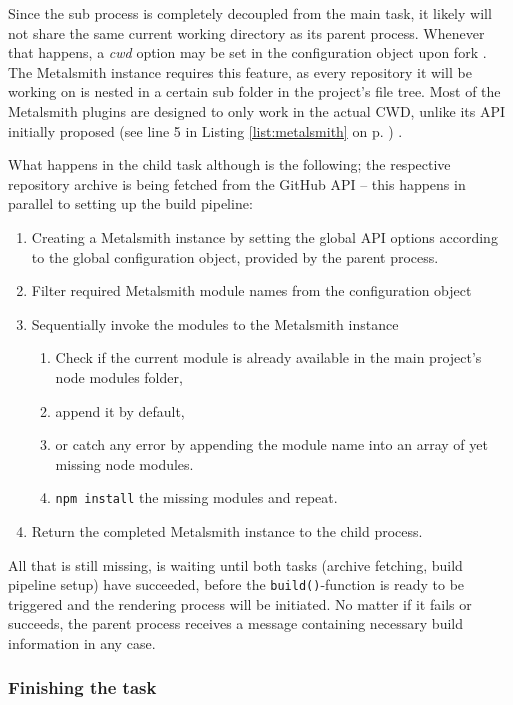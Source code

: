 Since the sub process is completely decoupled from the main task, it likely will not share the same current working directory as its parent process. Whenever that happens, a \emph{cwd} option may be set in the configuration object upon fork \cite{NodejsChildProcesses}. The Metalsmith instance requires this feature, as every repository it will be working on is nested in a certain sub folder in the project's file tree. Most of the Metalsmith plugins are designed to only work in the actual CWD, unlike its API initially proposed (see line 5 in Listing \ref{list:metalsmith} on p. \pageref{list:metalsmith}) \cite{MetalsmithRepository}.

What happens in the child task although is the following; the respective repository archive is being fetched from the GitHub API -- this happens in parallel to setting up the build pipeline:

\begin{enumerate}
  \item Creating a Metalsmith instance by setting the global API options according to the global configuration object, provided by the parent process.
  \item Filter required Metalsmith module names from the configuration object
  \item Sequentially invoke the modules to the Metalsmith instance
  \begin{enumerate}
    \item Check if the current module is already available in the main project's node modules folder,
    \item append it by default,
    \item or catch any error by appending the module name into an array of yet missing node modules.
    \item \texttt{npm install} the missing modules and repeat.
  \end{enumerate}
  \item Return the completed Metalsmith instance to the child process.
\end{enumerate}

All that is still missing, is waiting until both tasks (archive fetching, build pipeline setup) have succeeded, before the \texttt{build()}-function is ready to be triggered and the rendering process will be initiated. No matter if it fails or succeeds, the parent process receives a message containing necessary build information in any case.

\subsubsection{Finishing the task}
